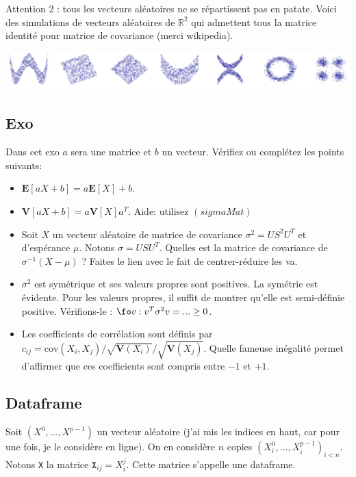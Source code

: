 \documentclass{article}
\begin{document}
Attention 2 :   tous les vecteurs aléatoires ne se répartissent pas en patate. Voici des simulations de vecteurs aléatoires de $\mathbb R^2$ qui admettent tous la matrice identité pour matrice de covariance (merci wikipedia). 
 

 \includegraphics[width=\linewidth]{graph/identite}
 

 \subsection{Exo}
 
 \begin{exo}  \label{exoab}  Dans cet exo $a$ sera une matrice et $b$ un vecteur. Vérifiez ou complétez les points suivants: 
 \begin{itemize}
 \item $\mathbf E[aX+b] =a \mathbf E[X]+b$.
 \item $\mathbf V[aX+b] = a\mathbf V[X]a^T$. Aide: utilisez $(sigmaMat)$
 \item Soit $X$ un vecteur aléatoire de matrice de covariance  $\sigma^2=U S^2 U^T$ et d'espérance $\mu$.  Notons $\sigma = U S U^T$.  Quelles est la matrice de covariance de $\sigma^{-1} (X-\mu) $ ?  Faites le lien avec le fait de centrer-réduire les va. 
 \item $\sigma^2$ est symétrique et ses valeurs propres sont positives. La symétrie est évidente. Pour les valeurs propres, il suffit de montrer qu'elle est semi-définie positive. Vérifions-le : $\fo v :  v^T \sigma^2 v = ... \geq 0$. 
 \item Les coefficients de corrélation sont définis par  $c_{ij} =\mathrm{cov}(X_i,X_j)  / \sqrt{\mathbf V(X_i)} / \sqrt{\mathbf V(X_j)}  $.  Quelle fameuse inégalité permet d'affirmer que ces coefficients sont compris entre $-1$ et $+1$.
 \end{itemize}
  \end{exo}


\subsection{Dataframe}


Soit $(X^0,...,X^{p-1})$ un vecteur aléatoire (j'ai mis les indices en haut, car pour une fois, je le considère en ligne).  On en considère $n$ copies   $(X^0_i,...,X^{p-1}_i)_{i<n}$.   Notons \verb$X$ la matrice $\mathtt X_{ij} = X_i^j$.  Cette matrice s'appelle une dataframe.  
\end{document}
